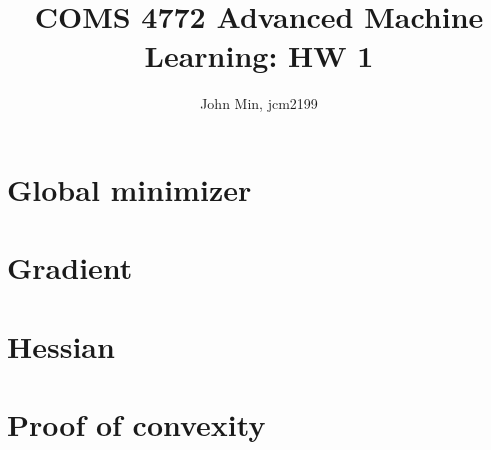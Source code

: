 \documentclass{article}
\author{John Min, jcm2199}
\title{COMS 4772 Advanced Machine Learning: HW 1}
\begin{document}
\maketitle

\section{Global minimizer}

\section{Gradient}

\section{Hessian}

\section{Proof of convexity}
\end{document}
